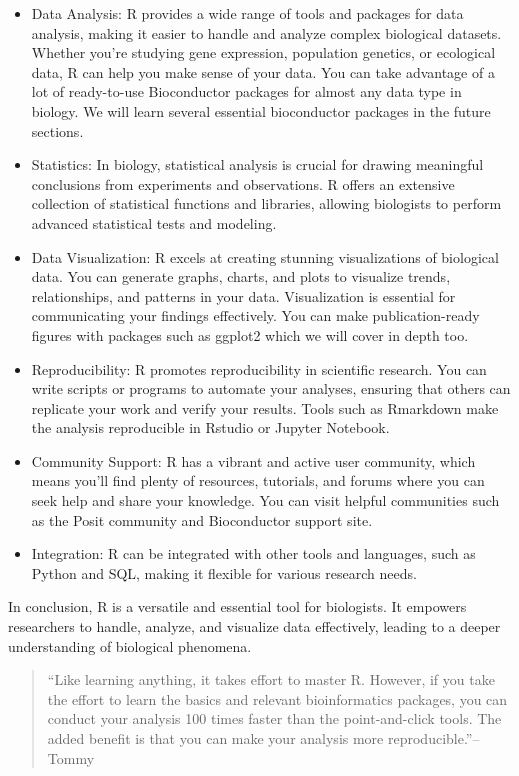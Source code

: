 \documentclass[
]{book}
\begin{document}
\begin{itemize}
\item
  Data Analysis: R provides a wide range of tools and packages for data analysis, making it easier to handle and analyze complex biological datasets. Whether you're studying gene expression, population genetics, or ecological data, R can help you make sense of your data. You can take advantage of a lot of ready-to-use Bioconductor packages for almost any data type in biology. We will learn several essential bioconductor packages in the future sections.
\item
  Statistics: In biology, statistical analysis is crucial for drawing meaningful conclusions from experiments and observations. R offers an extensive collection of statistical functions and libraries, allowing biologists to perform advanced statistical tests and modeling.
\item
  Data Visualization: R excels at creating stunning visualizations of biological data. You can generate graphs, charts, and plots to visualize trends, relationships, and patterns in your data. Visualization is essential for communicating your findings effectively. You can make publication-ready figures with packages such as ggplot2 which we will cover in depth too.
\item
  Reproducibility: R promotes reproducibility in scientific research. You can write scripts or programs to automate your analyses, ensuring that others can replicate your work and verify your results. Tools such as Rmarkdown make the analysis reproducible in Rstudio or Jupyter Notebook.
\item
  Community Support: R has a vibrant and active user community, which means you'll find plenty of resources, tutorials, and forums where you can seek help and share your knowledge. You can visit helpful communities such as the Posit community and Bioconductor support site.
\item
  Integration: R can be integrated with other tools and languages, such as Python and SQL, making it flexible for various research needs.
\end{itemize}

In conclusion, R is a versatile and essential tool for biologists. It empowers researchers to handle, analyze, and visualize data effectively, leading to a deeper understanding of biological phenomena.

\begin{quote}
``Like learning anything, it takes effort to master R. However, if you take the effort to learn the basics and relevant bioinformatics packages, you can conduct your analysis 100 times faster than the point-and-click tools. The added benefit is that you can make your analysis more reproducible.''-- Tommy
\end{quote}
\end{document}
